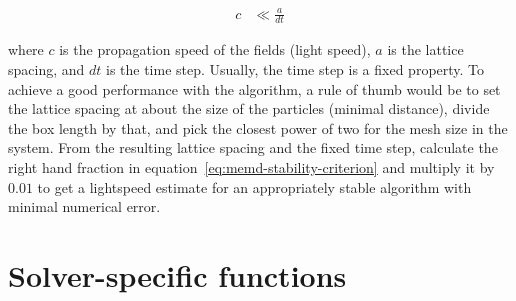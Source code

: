 \begin{align}
c & \ll  \frac{a}{dt} \label{eq:memd-stability-criterion}
\end{align}

where $c$ is the propagation speed of the fields (light speed), $a$ is the lattice spacing, and $dt$ is the time step. Usually, the time step is a fixed property. To achieve a good performance with the algorithm, a rule of thumb would be to set the lattice spacing at about the size of the particles (minimal distance), divide the box length by that, and pick the closest power of two for the mesh size in the system. From the resulting lattice spacing and the fixed time step, calculate the right hand fraction in equation~\eqref{eq:memd-stability-criterion} and multiply it by $0.01$ to get a lightspeed estimate for an appropriately stable algorithm with minimal numerical error.

\section{Solver-specific functions}
\label{sec:memd-functions}

